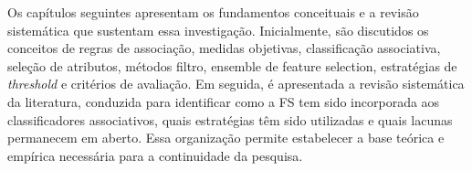 Os capítulos seguintes apresentam os fundamentos conceituais e a revisão sistemática que sustentam essa investigação. Inicialmente, são discutidos os conceitos de regras de associação, medidas objetivas, classificação associativa, seleção de atributos, métodos filtro, ensemble de feature selection, estratégias de \textit{threshold} e critérios de avaliação. Em seguida, é apresentada a revisão sistemática da literatura, conduzida para identificar como a FS tem sido incorporada aos classificadores associativos, quais estratégias têm sido utilizadas e quais lacunas permanecem em aberto. Essa organização permite estabelecer a base teórica e empírica necessária para a continuidade da pesquisa.
